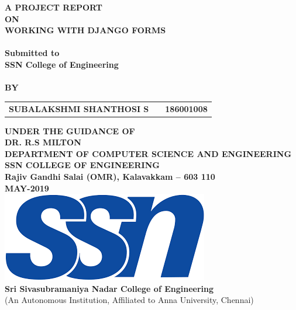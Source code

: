 \newpage
\begin{center}
\thispagestyle{empty}
\Large{\textbf{A PROJECT REPORT\\ON}}\\[0.3cm]
\Large{\textsc {\textbf{WORKING WITH DJANGO FORMS}}}\\
\Large{\textbf{\\Submitted to}}
\LARGE{\textbf{\\SSN College of Engineering\\}}
\vspace{1cm}
\Large{\textbf{\\BY}}\\[0.5cm]
\begin{table}[h]
	\centering
	\Large{
		\begin{tabular}{>{\bfseries}lc>{\bfseries}r}
			SUBALAKSHMI SHANTHOSI S & & 186001008 \\
	\end{tabular}}
\end{table}
\vspace{0.5cm}
\large{\textbf{UNDER THE GUIDANCE OF}}\\
\large{\textbf{DR. R.S MILTON}}\\
\vspace{1cm}
\large{\textbf{DEPARTMENT OF COMPUTER SCIENCE AND ENGINEERING}}\\
\Large{\textbf{SSN COLLEGE OF ENGINEERING}}\\
\vspace{0.5cm}
\large{\textbf{Rajiv Gandhi Salai (OMR), Kalavakkam – 603 110 }}
\large{\textbf{\\MAY-2019}}\\
\vspace{1cm}
\includegraphics[scale=0.35]{ssnLogoNew.png}\\
\Large{\textbf{Sri Sivasubramaniya Nadar College of Engineering\\}}
{(An Autonomous Institution, Affiliated to Anna University, Chennai)}\\
\end{center}